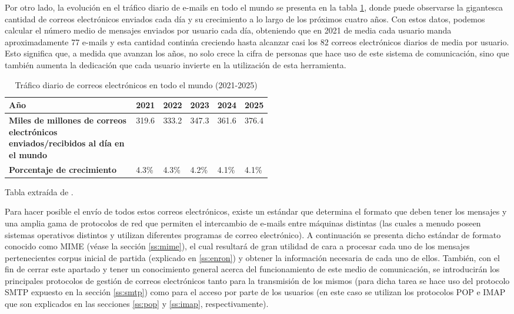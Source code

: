 Por otro lado, la evolución en el tráfico diario de e-mails en todo el mundo se presenta en la tabla \ref{tab:dailymail}, donde puede observarse la gigantesca cantidad de correos electrónicos enviados cada día y su crecimiento a lo largo de los próximos cuatro años. Con estos datos, podemos calcular el número medio de mensajes enviados por usuario cada día, obteniendo que en 2021 de media cada usuario manda aproximadamente 77 e-mails y esta cantidad continúa creciendo hasta alcanzar casi los 82 correos electrónicos diarios de media por usuario. Esto significa que, a medida que avanzan los años, no solo crece la cifra de personas que hace uso de este sistema de comunicación, sino que también aumenta la dedicación que cada usuario invierte en la utilización de esta herramienta.

\begin{table}[h]
	\centering
	\begin{tabular}{|p{0.52\linewidth}|l|l|l|l|l|}
		\hline
		\textbf{Año} & 2021 & 2022 & 2023 & 2024 & 2025 \\ \hline
		\textbf{Miles de millones de correos electrónicos enviados/recibidos al día en el mundo} & 319.6 & 333.2 & 347.3 & 361.6 & 376.4\\ \hline
		\textbf{Porcentaje de crecimiento} & 4.3\% & 4.3\% & 4.2\% & 4.1\% & 4.1\% \\ \hline
	\end{tabular}
	\caption{Tráfico diario de correos electrónicos en todo el mundo (2021-2025)}\label{tab:dailymail}
	Tabla extraída de \cite{radicati2020email}.
\end{table}

Para hacer posible el envío de todos estos correos electrónicos, existe un estándar que determina el formato que deben tener los mensajes y una amplia gama de protocolos de red que permiten el intercambio de e-mails entre máquinas distintas (las cuales a menudo poseen sistemas operativos distintos y utilizan diferentes programas de correo electrónico). A continuación se presenta dicho estándar de formato conocido como MIME (véase la sección \ref{ss:mime}), el cual resultará de gran utilidad de cara a procesar cada uno de los mensajes pertenecientes corpus inicial de partida (explicado en \ref{ss:enron}) y obtener la información necesaria de cada uno de ellos. También, con el fin de cerrar este apartado y tener un conocimiento general acerca del funcionamiento de este medio de comunicación, se introducirán los principales protocolos de gestión de correos electrónicos tanto para la transmisión de los mismos (para dicha tarea se hace uso del protocolo SMTP expuesto en la sección \ref{ss:smtp}) como para el acceso por parte de los usuarios (en este caso se utilizan los protocolos POP e IMAP que son explicados en las secciones \ref{ss:pop} y \ref{ss:imap}, respectivamente).

